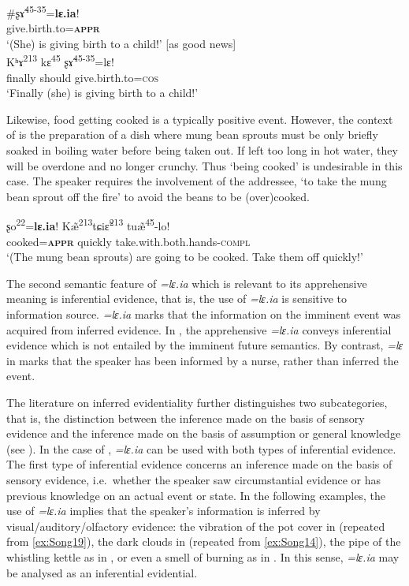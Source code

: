 \documentclass[output=paper,colorlinks,citecolor=brown, language=chinese]{langscibook}
\begin{document}
\ea \label{ex:Song25}
\ea \label{ex:Song25a}
\gll \#ʂ\~ɤ\textsuperscript{45-35}=\textbf{lɛ.ia}! \\
give.birth.to=\textsc{\textbf{appr}} \\
\glt `(She) is giving birth to a child!' [as good news] \\
\ex \label{ex:Song25b}
\gll Kʰɤ\textsuperscript{213} kɛ\textsuperscript{45} ʂ\~ɤ\textsuperscript{45-35}=lɛ! \\
finally should give.birth.to=\textsc{cos} \\
\glt `Finally (she) is giving birth to a child!'
\z
\z

 Likewise, food getting cooked is a typically positive event. However, the context of  is the preparation of a dish where mung bean sprouts must be only briefly soaked in boiling water before being taken out. If left too long in hot water, they will be overdone and no longer crunchy. Thus `being cooked' is undesirable in this case. The speaker requires the involvement of the addressee, `to take the mung bean sprout off the fire' to avoid the beans to be (over)cooked.


\ea\label{ex:Song26}
\gll ʂo\textsuperscript{22}=\textbf{lɛ.ia}! K\~æ\textsuperscript{213}tɕi\~ɛ\textsuperscript{213} tu\~æ\textsuperscript{45}-lo! \\
cooked=\textsc{\textbf{appr}} quickly take.with.both.hands-\textsc{compl} \\
\glt `(The mung bean sprouts) are going to be cooked. Take them off quickly!'
\z

 The second semantic feature of \textit{=lɛ.ia} which is relevant to its apprehensive meaning is inferential evidence, that is, the use of \textit{=lɛ.ia} is sensitive to information source. \textit{=lɛ.ia} marks that the information on the imminent event was acquired from inferred evidence. In , the apprehensive \textit{=lɛ.ia} conveys inferential evidence which is not entailed by the imminent future semantics. By contrast, \textit{=lɛ} in  marks that the speaker has been informed by a nurse, rather than inferred the event.

The literature on inferred evidentiality further distinguishes two subcategories, that is, the distinction between the inference made on the basis of sensory evidence and the inference made on the basis of assumption or general knowledge (see \cite[64, 174--176]{Aikhenvald2004}). In the case of , \textit{=lɛ.ia} can be used with both types of inferential evidence. The first type of inferential evidence concerns an inference made on the basis of sensory evidence, i.e.\  whether the speaker saw circumstantial evidence or has previous knowledge on an actual event or state. In the following examples, the use of \textit{=lɛ.ia} implies that the speaker's information is inferred by visual/auditory/olfactory evidence: the vibration of the pot cover in  (repeated from \ref{ex:Song19}), the dark clouds in  (repeated from \ref{ex:Song14}), the pipe of the whistling kettle as in , or even a smell of burning as in . In this sense, \textit{=lɛ.ia} may be analysed as an inferential evidential.
\end{document}
